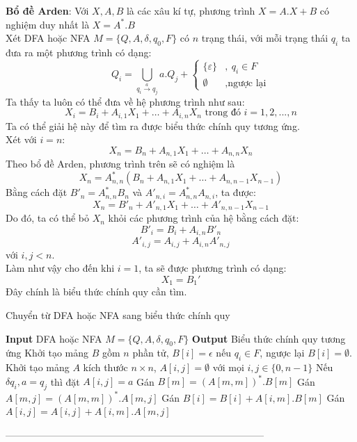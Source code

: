 \documentclass[14pt]{extreport}
\begin{document}
\textbf{Bổ đề Arden}: Với $X, A, B$ là các xâu kí tự, phương trình $X = A.X + B$ có nghiệm duy nhất là $X = A^*.B$\\
Xét DFA hoặc NFA $M = \{Q, A, \delta, q_0, F\}$ có $n$ trạng thái, với mỗi trạng thái $q_i$ ta đưa ra một phương trình có dạng:
\[\qquad \displaystyle Q_i = \bigcup\limits_{q_i \overset{a}{\to} q_j} a.Q_j + \begin{cases} \{\varepsilon\} &,\ q_i \in F \\ \emptyset &, \text{ngược lại}\end{cases}\]
Ta thấy ta luôn có thể đưa về hệ phương trình như sau:
\[X_i = B_i + A_{i,1}X_1 + … + A_{i,n}X_n \text{ trong đó } i = 1, 2, ..., n\]
Ta có thể giải hệ này để tìm ra được biểu thức chính quy tương ứng.\\
Xét với $i=n$:
\[X_n = B_n + A_{n,1}X_1 + … + A_{n,n}X_n\]
Theo bổ đề Arden, phương trình trên sẽ có nghiệm là 
\[X_n = A_{n,n}^* (B_n + A_{n,1}X_1 + … + A_{n,n-1}X_{n-1})\]
Bằng cách đặt $B'_n = A_{n,n}^* B_n$ và $A'_{n,i}=A_{n,n}^*A_{n,i}$, ta được:
\[X_n = B'_n + A'_{n,1}X_1 + … + A'_{n,n-1}X_{n-1}\]
Do đó, ta có thể bỏ $X_n$ khỏi các phương trình của hệ bằng cách đặt:
\[B'_i = B_i + A_{i,n}B'_n\]
\[A'_{i,j} = A_{i,j} + A_{i,n}A'_{n,j}\]
với $i, j < n$.\\
Làm như vậy cho đến khi $i=1$, ta sẽ được phương trình có dạng:
\[X_1 = B_1'\]
Đây chính là biểu thức chính quy cần tìm.
\begin{algorithm}[H]
\caption{Chuyển từ DFA hoặc NFA sang biểu thức chính quy}
\begin{algorithmic} 
\STATE \textbf{Input} DFA hoặc NFA $M = \{Q, A, \delta, q_0, F\}$
\STATE \textbf{Output} Biểu thức chính quy tương ứng
\STATE Khởi tạo mảng $B$ gồm $n$ phần tử, $B[i] = \epsilon$ nếu $q_i \in F$, ngược lại $B[i] = \emptyset$.
\STATE Khởi tạo mảng $A$ kích thước $n \times n$, $A[i, j] = \emptyset$ với mọi $i, j \in \{0, n-1\}$
\STATE Nếu $\delta{q_i, a} = q_j$ thì đặt $A[i, j] = a$
\STATE Gán $B[m] = (A[m, m])^*.B[m]$
\STATE Gán $A[m, j] = (A[m, m])^*.A[m, j]$
\ENDFOR
{}
\STATE Gán $B[i] = B[i] + A[i, m].B[m]$
\STATE Gán $A[i, j] = A[i, j] + A[i, m].A[m, j]$
\ENDFOR
\ENDFOR
\ENDFOR
\end{algorithmic}
\end{algorithm}
--------------------------------------------------------------------------------\\
\end{document}
